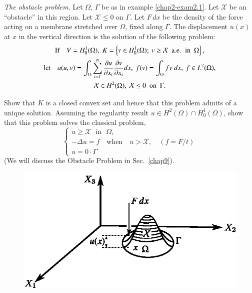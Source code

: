 \begin{exercise}\label{chap2-exer2.1}
{\em The obstacle problem}. Let $\Omega$, $\Gamma$ be as in example
\eqref{chap2-exam2.1}. Let $\mathcal{X}$ be an ``obstacle'' in this
region. Let $\mathcal{X}\leq 0$ on $\Gamma$. Let $F\,dx$ be the
density of the force acting on a membrane stretched over $\Omega$,
fixed along $\Gamma$. The displacement $u(x)$ at $x$ in the vertical
direction is the solution of the following problem:
\begin{gather*}  
\text{If}\quad V=H^{1}_{0}(\Omega),\ K=\left\{v\in H^{1}_{0}(\Omega);\
v\geq \mathcal{X}\text{~ a.e.~ in~ }\Omega\right\},\\
\text{let}\quad a(u,v)=\int_{\Omega}\sum^{n}_{i=1}\frac{\partial u}{\partial
  x_{i}}\frac{\partial v}{\partial x_{i}}dx,\ f(v)=\int_{\Omega}fv\ dx,\ f\in
L^{2}(\Omega),\\
\mathcal{X}\in H^{2}(\Omega),\ \mathcal{X}\leq 0\text{~ on~ }\Gamma.
\end{gather*}

Show that $K$ is a closed convex set and hence that this problem
admits of a unique solution. Assuming the regularity result $u\in
H^{2}(\Omega)\cap H^{1}_{0}(\Omega)$, show that this problem solves
the classical problem,
$$
\begin{cases}
u\geq \mathcal{X}\text{~ in~ } \Omega,\\
-\Delta u=f\quad\text{when}\quad u>\mathcal{X},\quad (f=F/t)\\
u=0\cdot \Gamma
\end{cases}
$$
(We will discuss the Obstacle Problem in Sec.~\ref{chap9}).
\end{exercise}

\begin{figure}[H]
\centering
\includegraphics[scale=1.1]{figure/fig2.2.eps}
\caption{}\label{chap2-fig2.2}
\end{figure}

